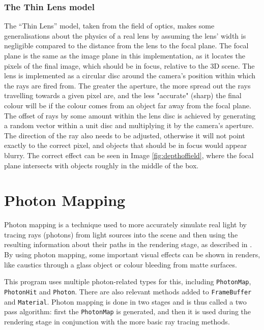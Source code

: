 \documentclass[a4paper]{article}
\begin{document}
\subsubsection{The Thin Lens model}
The ``Thin Lens'' model, taken from the field of optics, makes some generalisations about the physics of a real lens by assuming the lens' width is negligible compared to the distance from the lens to the focal plane. The focal plane is the same as the image plane in this implementation, as it locates the pixels of the final image, which should be in focus, relative to the 3D scene. The lens is implemented as a circular disc around the camera's position within which the rays are fired from. The greater the aperture, the more spread out the rays travelling towards a given pixel are, and the less "accurate" (sharp) the final colour will be if the colour comes from an object far away from the focal plane.\\

The offset of rays by some amount within the lens disc is achieved by generating a random vector within a unit disc and multiplying it by the camera's aperture. The direction of the ray also needs to be adjusted, otherwise it will not point exactly to the correct pixel, and objects that should be in focus would appear blurry. The correct effect can be seen in Image \ref{fig:depthoffield}, where the focal plane intersects with objects roughly in the middle of the box.

\section{Photon Mapping}
Photon mapping is a technique used to more accurately simulate real light by tracing rays (photons) from light sources into the scene and then using the resulting information about their paths in the rendering stage, as described in \cite{Jensen1996photonmaps}. By using photon mapping, some important visual effects can be shown in renders, like caustics through a glass object or colour bleeding from matte surfaces.

This program uses multiple photon-related types for this, including \texttt{PhotonMap}, \texttt{PhotonHit} and \texttt{Photon}. There are also relevant methods added to \texttt{FrameBuffer} and \texttt{Material}. Photon mapping is done in two stages and is thus called a two pass algorithm: first the \texttt{PhotonMap} is generated, and then it is used during the rendering stage in conjunction with the more basic ray tracing methods.
\end{document}
